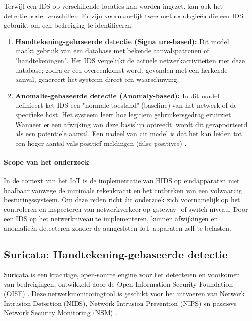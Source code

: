 \vspace{1em}
Terwijl een IDS op verschillende locaties kan worden ingezet, kan ook het detectiemodel verschillen. Er zijn voornamelijk twee methodologieën die een IDS gebruikt om een bedreiging te identificeren.

\begin{enumerate}
    \item \textbf{Handtekening-gebaseerde detectie (Signature-based):} Dit model maakt gebruik van een database met bekende aanvalspatronen of "handtekeningen". Het IDS vergelijkt de actuele netwerkactiviteiten met deze database; zodra er een overeenkomst wordt gevonden met een herkende aanval, genereert het systeem direct een waarschuwing.
    
    \item \textbf{Anomalie-gebaseerde detectie (Anomaly-based):} In dit model definieert het IDS een "normale toestand" (baseline) van het netwerk of de specifieke host. Het systeem leert hoe legitiem gebruikersgedrag eruitziet. Wanneer er een afwijking van deze basislijn optreedt, wordt dit gerapporteerd als een potentiële aanval. Een nadeel van dit model is dat het kan leiden tot een hoger aantal vals-positief meldingen (false positives) \autocite{Patcha2007Anomaly}.
\end{enumerate}


\paragraph{Scope van het onderzoek}
In de context van het IoT is de implementatie van HIDS op eindapparaten niet haalbaar vanwege de minimale rekenkracht en het ontbreken van een volwaardig besturingssysteem. Om deze reden richt dit onderzoek zich voornamelijk op het controleren en inspecteren van netwerkverkeer op gateway- of switch-niveau. Door een IDS op het netwerkniveau te implementeren, kunnen afwijkingen en anomalieën detecteren zonder de aangesloten IoT-apparaten zelf te belasten.


\subsection{Suricata: Handtekening-gebaseerde detectie}

Suricata is een krachtige, open-source engine voor het detecteren en voorkomen van bedreigingen, ontwikkeld door de Open Information Security Foundation (OISF) \autocite{SuricataDocs2024}. Deze netwerkmonitoringtool is geschikt voor het uitvoeren van Network Intrusion Detection (NIDS), Network Intrusion Prevention (NIPS) en passieve Network Security Monitoring (NSM) \autocite{Amoretti2025}.

